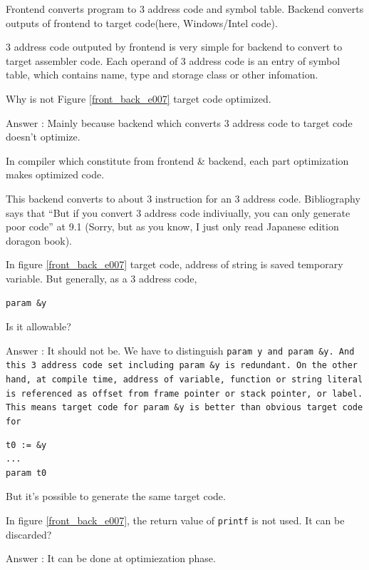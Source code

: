 Frontend converts program to 3 address code and symbol table.
Backend converts outputs of frontend to target code(here, Windows/Intel code).

3 address code outputed by frontend is very simple for backend to
convert to target assembler code. Each operand of 3 address code
is an entry of symbol table, which contains name, type and storage class
or other infomation.

\begin{QandA}
Why is not Figure \ref{front_back_e007} target code optimized.

Answer : Mainly because backend which converts 3 address code to target code
doesn't optimize.

In compiler which constitute from frontend \& backend, each part
optimization makes optimized code.

This backend converts to about 3 instruction for an 3 address code.
Bibliography \cite{doragon} says that ``But if you convert 3 address code
 indiviually, you can only generate poor code'' at 9.1
(Sorry, but as you know, I just only read Japanese edition doragon book).
\end{QandA}

\begin{QandA}
\label{front_back_e003}
In figure \ref{front_back_e007} target code, address of string is saved
temporary variable. But generally, as a 3 address code,
\begin{verbatim}
param &y
\end{verbatim}
Is it allowable?

Answer : It should not be. We have to distinguish \tt{param y} and
\tt{param \&y}. And this 3 address code set including \tt{param \&y} is
redundant. On the other hand, at compile time, address of
variable, function or string literal is referenced as offset from
frame pointer or stack pointer, or label. This means target code
for \tt{param \&y} is better than obvious target code for
\begin{verbatim}
t0 := &y
...
param t0
\end{verbatim}
But it's possible to generate the same target code.
\end{QandA}

\begin{QandA}
In figure \ref{front_back_e007}, the return value of {\tt{printf}} 
is not used. It can be discarded?

Answer : It can be done at optimiezation phase.
\end{QandA}

